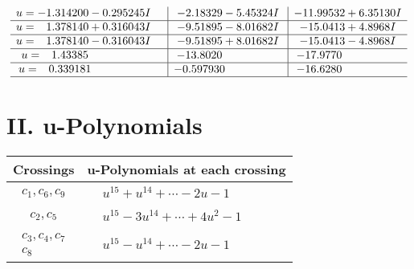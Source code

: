 \documentclass[1p]{elsarticle_modified}
\theoremstyle{definition}
\begin{document}
$$\begin{array}{c|c|c}
\begin{aligned}
u &= -1.314200 - 0.295245 I\end{aligned}
 & -2.18329 - 5.45324 I & -11.99532 + 6.35130 I \\ \hline\begin{aligned}
u &= \phantom{-}1.378140 + 0.316043 I\end{aligned}
 & -9.51895 - 8.01682 I & -15.0413 + 4.8968 I \\ \hline\begin{aligned}
u &= \phantom{-}1.378140 - 0.316043 I\end{aligned}
 & -9.51895 + 8.01682 I & -15.0413 - 4.8968 I \\ \hline\begin{aligned}
u &= \phantom{-}1.43385\phantom{ +0.000000I}\end{aligned}
 & -13.8020\phantom{ +0.000000I} & -17.9770\phantom{ +0.000000I} \\ \hline\begin{aligned}
u &= \phantom{-}0.339181\phantom{ +0.000000I}\end{aligned}
 & -0.597930\phantom{ +0.000000I} & -16.6280\phantom{ +0.000000I}\\
 \hline 
 \end{array}$$\newpage
\newpage\renewcommand{\arraystretch}{1}
\centering \section*{ II. u-Polynomials}
\begin{tabular}{m{50pt}|m{274pt}}
Crossings & \hspace{64pt}u-Polynomials at each crossing \\
\hline $$\begin{aligned}c_{1},c_{6},c_{9}\end{aligned}$$&$\begin{aligned}
&u^{15}+u^{14}+\cdots-2 u-1
\end{aligned}$\\
\hline $$\begin{aligned}c_{2},c_{5}\end{aligned}$$&$\begin{aligned}
&u^{15}-3 u^{14}+\cdots+4 u^2-1
\end{aligned}$\\
\hline $$\begin{aligned}c_{3},c_{4},c_{7}\\c_{8}\end{aligned}$$&$\begin{aligned}
&u^{15}- u^{14}+\cdots-2 u-1
\end{aligned}$\\
\hline
\end{tabular}\newpage\renewcommand{\arraystretch}{1}
\end{document}
